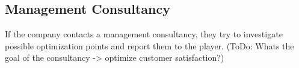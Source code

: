 \subsection{Management Consultancy}
If the company contacts a management consultancy, they try to investigate possible optimization points and report them to the player. (ToDo: Whats the goal of the consultancy -> optimize customer satisfaction?) 

